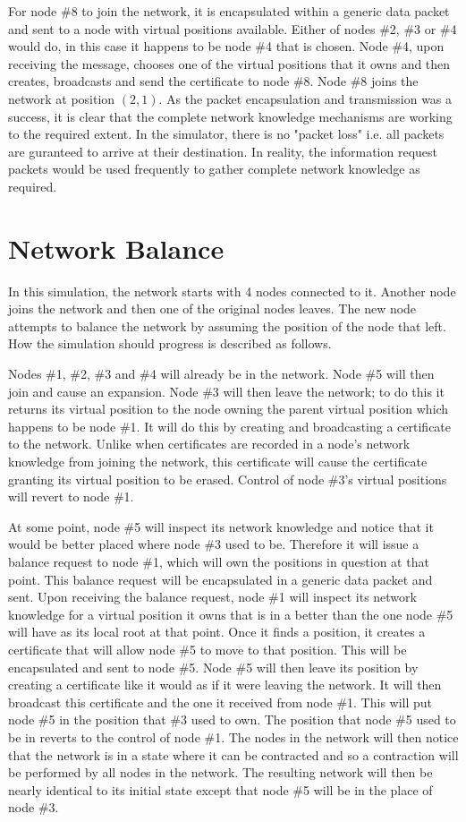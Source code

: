 \documentclass[ %
                    author={Luke Murray},
                supervisor={Dr. Simon Hollis},
                     title={Shadow Peer-to-Peer Networks},
                  subtitle={},
                    degree={MEng},
                      year={2013} ]{thesis}
\begin{document}
For node \#8 to join the network, it is encapsulated within a generic data packet and sent to a node with virtual positions available. Either of nodes \#2, \#3 or \#4 would do, in this case it happens to be node \#4 that is chosen. Node \#4, upon receiving the message, chooses one of the virtual positions that it owns and then creates, broadcasts and send the certificate to node \#8. Node \#8 joins the network at position $(2, 1)$. As the packet encapsulation and transmission was a success, it is clear that the complete network knowledge mechanisms are working to the required extent. In the simulator, there is no "packet loss" i.e. all packets are guranteed to arrive at their destination. In reality, the information request packets would be used frequently to gather complete network knowledge as required.

\section{Network Balance}

In this simulation, the network starts with 4 nodes connected to it. Another node joins the network and then one of the original nodes leaves. The new node attempts to balance the network by assuming the position of the node that left. How the simulation should progress is described as follows.

Nodes \#1, \#2, \#3 and \#4 will already be in the network. Node \#5 will then join and cause an expansion. Node \#3 will then leave the network; to do this it returns its virtual position to the node owning the parent virtual position which happens to be node \#1. It will do this by creating and broadcasting a certificate to the network. Unlike when certificates are recorded in a node's network knowledge from joining the network, this certificate will cause the certificate granting its virtual position to be erased. Control of node \#3's virtual positions will revert to node \#1.

At some point, node \#5 will inspect its network knowledge and notice that it would be better placed where node \#3 used to be. Therefore it will issue a balance request to node \#1, which will own the positions in question at that point. This balance request will be encapsulated in a generic data packet and sent. Upon receiving the balance request, node \#1 will inspect its network knowledge for a virtual position it owns that is in a better than the one node \#5 will have as its local root at that point. Once it finds a position, it creates a certificate that will allow node \#5 to move to that position. This will be encapsulated and sent to node \#5. Node \#5 will then leave its position by creating a certificate like it would as if it were leaving the network. It will then broadcast this certificate and the one it received from node \#1. This will put node \#5 in the position that \#3 used to own. The position that node \#5 used to be in reverts to the control of node \#1. The nodes in the network will then notice that the network is in a state where it can be contracted and so a contraction will be performed by all nodes in the network. The resulting network will then be nearly identical to its initial state except that node \#5 will be in the place of node \#3.
\end{document}
